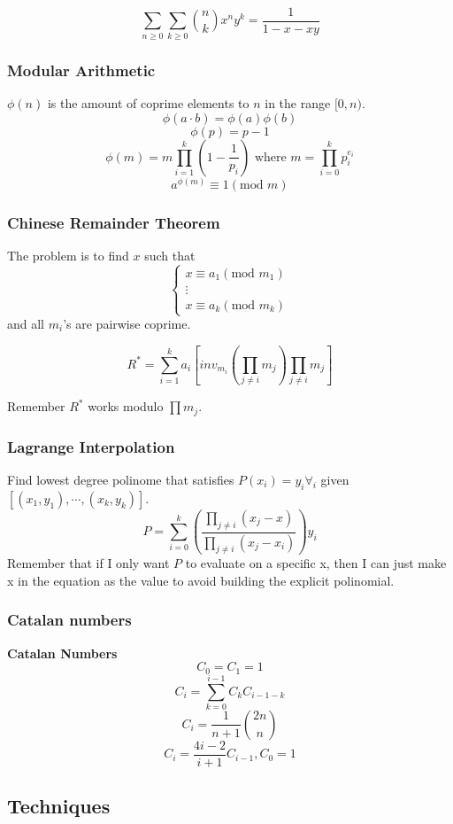 \documentclass[landscape, 9pt, a4paper, oneside, twocolumn]{extarticle}
\begin{document}
	\[\sum_{n\geq 0}\sum_{k\geq 0}\binom{n}{k}x^ny^k=\frac{1}{1-x-xy}\]
	
	\subsubsection{Modular Arithmetic}
	$\phi(n)$ is the amount of coprime elements to $n$ in the range $[0,n)$.
	\[\phi(a\cdot b)=\phi(a)\phi(b)\]
	\[\phi(p)=p-1\]
	\[\phi(m)=m\prod_{i=1}^k(1-\frac{1}{p_i}) \text{ where } m=\prod_{i=0}^kp_i^{e_i}\]
	\[a^{\phi(m)}\equiv 1 (\text{mod }m)\]
	
	\subsubsection{Chinese Remainder Theorem}
	The problem is to find $x$ such that
	\[\begin{cases}
		x\equiv a_1 (\text{mod }m_1)\\
		\vdots\\
		x\equiv a_k (\text{mod }m_k)
	\end{cases}\]
	and all $m_i$'s are pairwise coprime.
	
	\[R^*=\sum_{i=1}^k a_i\left[inv_{m_i}\left(\prod_{j\neq i}m_j\right)\prod_{j\neq i}m_j\right]\]
	
	Remember $R^*$ works modulo $\prod m_j$.
	
	\subsubsection{Lagrange Interpolation}
	Find lowest degree polinome that satisfies $P(x_i)=y_i\forall_i$ given $[(x_1,y_1),\cdots,(x_k,y_k)]$.
	\[P=\sum_{i=0}^k\left(\frac{\prod_{j\neq i}(x_j-x)}{\prod_{j\neq i}(x_j-x_i)}\right)y_i\]
	Remember that if I only want $P$ to evaluate on a specific x, then I can just make x in the equation as the value to avoid building the explicit polinomial.
	
	\subsubsection{Catalan numbers}
	\textbf{Catalan Numbers}
	\[C_0 = C_1 = 1\]
	\[C_i = \sum_{k=0}^{i-1} C_kC_{i-1-k}\]
	\[C_i = \frac{1}{n+1}\binom{2n}{n}\]
	\[C_i = \frac{4i-2}{i+1}C_{i-1},C_0=1\]
	
	\subsection{Techniques}
	
\end{document}

